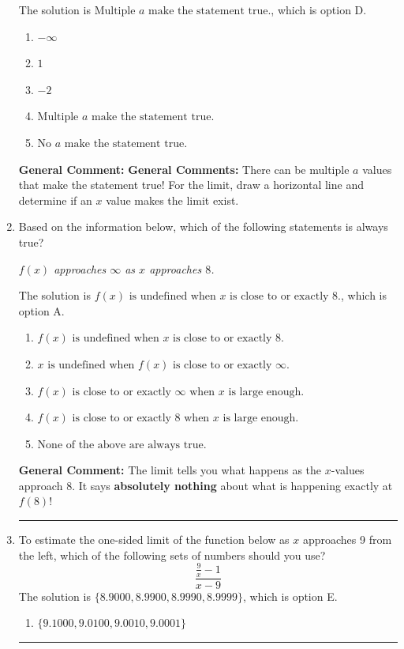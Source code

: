 \documentclass{extbook}[14pt]
\newcommand{\litem}[1]{\item #1

\rule{\textwidth}{0.4pt}}
\begin{document}
\begin{enumerate}
{The solution is \( \text{Multiple } a \text{ make the statement true}. \), which is option D.\begin{enumerate}[label=\Alph*.]
\item \( -\infty \)


\item \( 1 \)


\item \( -2 \)


\item \( \text{Multiple } a \text{ make the statement true}. \)


\item \( \text{No } a \text{ make the statement true}. \)


\end{enumerate}

\textbf{General Comment:} \textbf{General Comments:} There can be multiple $a$ values that make the statement true! For the limit, draw a horizontal line and determine if an $x$ value makes the limit exist.
}
\litem{
Based on the information below, which of the following statements is always true?

\begin{center}
    \textit{ $f(x)$ approaches $\infty$ as $x$ approaches $8$. }
\end{center}
The solution is \( f(x) \text{ is undefined when } x \text{ is close to or exactly } 8. \), which is option A.\begin{enumerate}[label=\Alph*.]
\item \( f(x) \text{ is undefined when } x \text{ is close to or exactly } 8. \)


\item \( x \text{ is undefined when } f(x) \text{ is close to or exactly } \infty. \)


\item \( f(x) \text{ is close to or exactly } \infty \text{ when } x \text{ is large enough}. \)


\item \( f(x) \text{ is close to or exactly } 8 \text{ when } x \text{ is large enough}. \)


\item \( \text{None of the above are always true.} \)


\end{enumerate}

\textbf{General Comment:} The limit tells you what happens as the $x$-values approach $8$. It says \textbf{absolutely nothing} about what is happening exactly at $f(8)$!
}
\litem{
To estimate the one-sided limit of the function below as $x$ approaches 9 from the left, which of the following sets of numbers should you use?
\[ \frac{\frac{9}{x} - 1}{x - 9} \]The solution is \( \{ 8.9000, 8.9900, 8.9990, 8.9999 \} \), which is option E.\begin{enumerate}[label=\Alph*.]
\item \( \{ 9.1000, 9.0100, 9.0010, 9.0001 \} \)


\end{enumerate}}
\end{enumerate}
\end{document}
